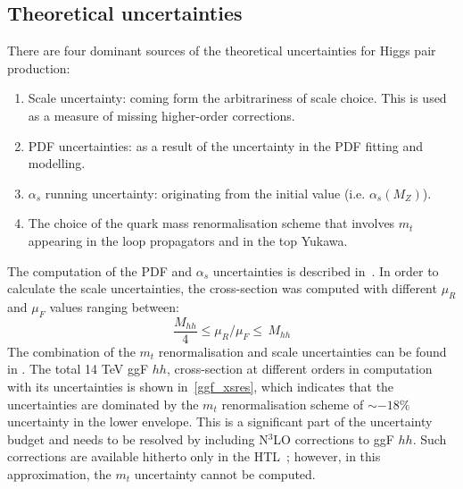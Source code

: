 \subsection{Theoretical uncertainties}
There are four dominant sources of the theoretical uncertainties for Higgs pair production:
\begin{enumerate}
	\item Scale uncertainty: coming form the arbitrariness of scale choice. This is used as a measure of missing higher-order corrections.
	\item PDF uncertainties: as a result of the uncertainty in the PDF fitting and modelling.
	\item $\alpha_s$ running uncertainty: originating from the initial value (i.e. $\alpha_s(M_Z) $).
	\item The choice of the quark mass renormalisation scheme that involves $m_t$ appearing in the loop propagators and in the top Yukawa.
\end{enumerate}
The computation of the PDF and $\alpha_s$ uncertainties is described in~\cite{Martin:2009bu, Demartin:2010er}.
In order to calculate the scale uncertainties, the cross-section was computed with different $ \mu_R$ and $\mu_F$ values ranging between:
\begin{equation}
	\frac{M_{hh}}{4} \leq \mu_R/\mu_F  \leq \,M_{hh}
\end{equation}
The combination of the $m_t$ renormalisation and scale uncertainties can be found in \cite{Baglio:2020wgt}.
The total 14 TeV ggF $hh$, cross-section at different orders in computation with its uncertainties is shown in~\autoref{ggf_xsres}, which indicates that the uncertainties are dominated by the $m_t$ renormalisation scheme of $\sim -18\%$ uncertainty in the lower envelope.  This is a significant part of the uncertainty budget and needs to be resolved by including N$^3$LO corrections to ggF $hh$. Such corrections are available hitherto only in the HTL~\cite{Chen:2019lzz,Chen:2019fhs}; however, in this approximation, the $m_t$ uncertainty cannot be computed.
%
